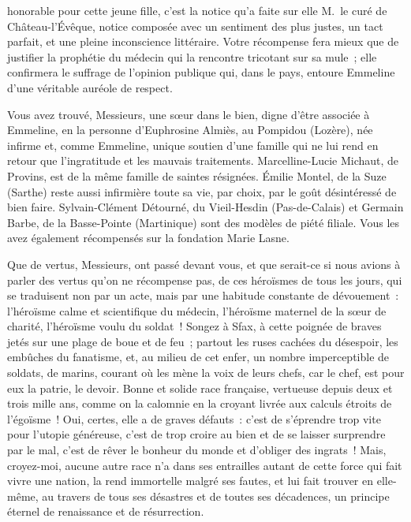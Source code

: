 \documentclass[french,twoside]{book} %
\newcommand\orgName[1]{#1}
\newcommand\persName[1]{#1}
\newcommand\placeName[1]{#1}
\begin{document}
honorable pour cette jeune fille, c’est la notice qu’a faite sur elle M. le curé de {\placeName Château-l’Évêque}, notice composée avec un sentiment des plus justes, un tact parfait, et une pleine inconscience littéraire. Votre récompense fera mieux que de justifier la prophétie du médecin qui la rencontre tricotant sur sa mule ; elle confirmera le suffrage de l’opinion publique qui, dans le pays, entoure {\persName Emmeline} d’une véritable auréole de respect.\par
Vous avez trouvé, Messieurs, une sœur dans le bien, digne d’être associée à {\persName Emmeline}, en la personne d’{\persName Euphrosine Almiès}, au {\placeName Pompidou} ({\placeName Lozère}), née infirme et, comme {\persName Emmeline}, unique soutien d’une famille qui ne lui rend en retour que l’ingratitude et les mauvais traitements. {\persName Marcelline-Lucie Michaut}, de {\placeName Provins}, est de la même famille de saintes résignées. {\persName Émilie Montel}, de la {\placeName Suze} ({\placeName Sarthe}) reste aussi infirmière toute sa vie, par choix, par le goût désintéressé de bien faire. {\persName Sylvain-Clément Détourné}, du {\placeName Vieil-Hesdin} ({\placeName Pas-de-Calais}) et {\persName Germain Barbe}, de la {\placeName Basse-Pointe} ({\placeName Martinique}) sont des modèles de piété filiale. Vous les avez également récompensés sur la {\orgName fondation Marie Lasne}.\par
Que de vertus, Messieurs, ont passé devant vous, et que serait-ce si nous avions à parler des vertus qu’on ne récompense pas, de ces héroïsmes de tous les jours, qui se traduisent non par un acte, mais par une habitude constante de dévouement : l’héroïsme calme et scientifique du médecin, l’héroïsme maternel de la sœur de charité, l’héroïsme voulu du soldat ! Songez à {\placeName Sfax}, à cette poignée de braves jetés sur une plage de boue et de feu ; partout les ruses cachées du désespoir, les embûches du fanatisme, et, au milieu de cet enfer, un nombre imperceptible de soldats, de marins, courant où les mène la voix de leurs chefs, car le chef, est pour eux la patrie, le devoir. Bonne et solide race française, vertueuse depuis deux et trois mille ans, comme on la calomnie en la croyant livrée aux calculs étroits de l’égoïsme ! Oui, certes, elle a de graves défauts : c’est de s’éprendre trop vite pour l’utopie généreuse, c’est de trop croire au bien et de se laisser surprendre par le mal, c’est de rêver le bonheur du monde et d’obliger des ingrats ! Mais, croyez-moi, aucune autre race n’a dans ses entrailles autant de cette force qui fait vivre une nation, la rend immortelle malgré ses fautes, et lui fait trouver en elle-même, au travers de tous ses désastres et de toutes ses décadences, un principe éternel de renaissance et de résurrection.\par
\end{document}

